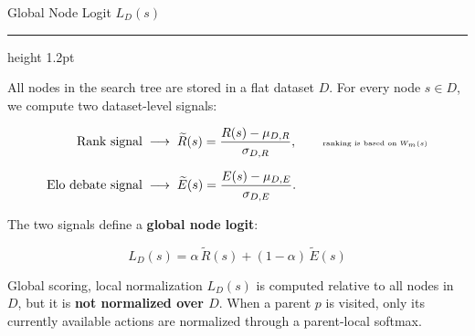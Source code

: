\documentclass[aspectratio=169]{beamer}
\begin{document}
\begin{frame}{Global Node Logit $L_D(s)$}
\vspace{0.8em}
{\color{titledred}\hrule height 1.2pt}
\vspace{1em}

All nodes in the search tree are stored in a flat dataset \(D\).
For every node \(s \in D\), we compute two dataset-level signals:

\vspace{-0.4em}
{\footnotesize
\begin{align}
  \text{Rank signal}
  &\;\longrightarrow\;
  \widetilde{R}(s)
  =
  \frac{R(s)-\mu_{D,R}}{\sigma_{D,R}},
  \qquad
  \text{\tiny ranking is based on \(W_m(s)\)}
  \\[0.6em]
  \text{Elo debate signal}
  &\;\longrightarrow\;
  \widetilde{E}(s)
  =
  \frac{E(s)-\mu_{D,E}}{\sigma_{D,E}} .
\end{align}
}

\vspace{0.4em}
The two signals define a \textbf{global node logit}:

{\footnotesize
\begin{equation*}
  \boxed{
  L_D(s)
  =
  \alpha\,\widetilde{R}(s)
  +
  (1-\alpha)\,\widetilde{E}(s)
  }
\end{equation*}
}

\vspace{0.2em}

\begin{block}{Global scoring, local normalization}
\(L_D(s)\) is computed relative to all nodes in \(D\), but it is
\textbf{not normalized over \(D\)}.
When a parent \(p\) is visited, only its currently available actions
are normalized through a parent-local softmax.
\end{block}

\end{frame}
\end{document}
